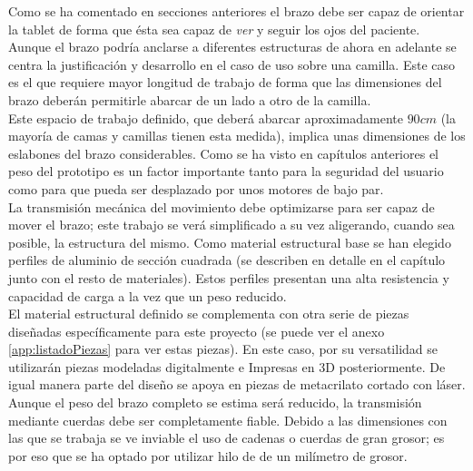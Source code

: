     Como se ha comentado en secciones anteriores el brazo debe ser capaz de orientar la tablet de forma que ésta sea capaz de \textit{ver} y seguir los ojos del paciente. Aunque el brazo podría anclarse a diferentes estructuras de ahora en adelante se centra la justificación y desarrollo en el caso de uso sobre una camilla. Este caso es el que requiere mayor longitud de trabajo de forma que las dimensiones del brazo deberán permitirle abarcar de un lado a otro de la camilla.
    \\

    Este espacio de trabajo definido, que deberá abarcar aproximadamente $90cm$ (la mayoría de camas y camillas tienen esta medida), implica unas dimensiones de los eslabones del brazo considerables. Como se ha visto en capítulos anteriores el peso del prototipo es un factor importante tanto para la seguridad del usuario como para que pueda ser desplazado por unos motores de bajo par.
    \\

    La transmisión mecánica del movimiento debe optimizarse para ser capaz de mover el brazo; este trabajo se verá simplificado a su vez aligerando, cuando sea posible, la estructura del mismo. Como material estructural base se han elegido perfiles de aluminio de sección cuadrada (se describen en detalle en el capítulo \completar junto con el resto de materiales). Estos perfiles presentan una alta resistencia y capacidad de carga a la vez que un peso reducido.
    \\

    El material estructural definido se complementa con otra serie de piezas diseñadas específicamente para este proyecto (se puede ver el anexo \ref{app:listadoPiezas} para ver estas piezas). En este caso, por su versatilidad se utilizarán piezas modeladas digitalmente e Impresas en 3D posteriormente. De igual manera parte del diseño se apoya en piezas de metacrilato cortado con láser.
    \\

    Aunque el peso del brazo completo se estima será reducido, la transmisión mediante cuerdas debe ser completamente fiable. Debido a las dimensiones con las que se trabaja se ve inviable el uso de cadenas o cuerdas de gran grosor; es por eso que se ha optado por utilizar hilo de  de un milímetro de grosor.
    \\

